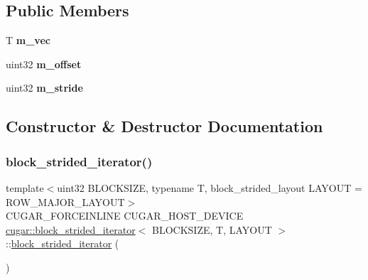 \subsection*{Public Members}
\begin{DoxyCompactItemize}
\item 
\mbox{\label{structcugar_1_1block__strided__iterator_abfe686c51edccf48a894b6c264dbb7f3}} 
T {\bfseries m\+\_\+vec}
\item 
\mbox{\label{structcugar_1_1block__strided__iterator_aeeeab7e2ffabeb9c9c5bf57e0774e952}} 
uint32 {\bfseries m\+\_\+offset}
\item 
\mbox{\label{structcugar_1_1block__strided__iterator_acf74ab6caa1595fd9e8bea6899279b45}} 
uint32 {\bfseries m\+\_\+stride}
\end{DoxyCompactItemize}


\subsection{Constructor \& Destructor Documentation}
\mbox{\label{structcugar_1_1block__strided__iterator_a046692224c95e2f75d3705be1e457f6d}} 
\subsubsection{\texorpdfstring{block\+\_\+strided\+\_\+iterator()}{block\_strided\_iterator()}\hspace{0.1cm}{\footnotesize\ttfamily [1/2]}}
{\footnotesize\ttfamily template$<$uint32 B\+L\+O\+C\+K\+S\+I\+ZE, typename T, block\+\_\+strided\+\_\+layout L\+A\+Y\+O\+UT = R\+O\+W\+\_\+\+M\+A\+J\+O\+R\+\_\+\+L\+A\+Y\+O\+UT$>$ \\
C\+U\+G\+A\+R\+\_\+\+F\+O\+R\+C\+E\+I\+N\+L\+I\+NE C\+U\+G\+A\+R\+\_\+\+H\+O\+S\+T\+\_\+\+D\+E\+V\+I\+CE \hyperlink{structcugar_1_1block__strided__iterator}{cugar\+::block\+\_\+strided\+\_\+iterator}$<$ B\+L\+O\+C\+K\+S\+I\+ZE, T, L\+A\+Y\+O\+UT $>$\+::\hyperlink{structcugar_1_1block__strided__iterator}{block\+\_\+strided\+\_\+iterator} (\begin{DoxyParamCaption}{ }\end{DoxyParamCaption})\hspace{0.3cm}{\ttfamily [inline]}}

